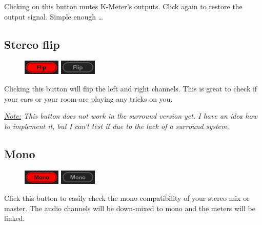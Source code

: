 Clicking on this button mutes K-Meter's outputs.  Click again to
restore the output signal.  Simple enough \dots

\subsection{Stereo flip}

\begin{figure}
\includegraphics[scale=\screenshotscale,clip]{include/images/button_flip_on.png}
\newline \vspace{-0.9\baselineskip}
\includegraphics[scale=\screenshotscale,clip]{include/images/button_flip_off.png}
\end{figure}

Clicking this button will flip the left and right channels.  This is
great to check if your ears or your room are playing any tricks on
you.

\emph{\underline{Note:} This button does not work in the surround
  version yet.  I have an idea how to implement it, but I can't test
  it due to the lack of a surround system.}

\newpage %

\subsection{Mono}

\begin{figure}
\includegraphics[scale=\screenshotscale,clip]{include/images/button_mono_on.png}
\newline \vspace{-0.9\baselineskip}
\includegraphics[scale=\screenshotscale,clip]{include/images/button_mono_off.png}
\end{figure}

Click this button to easily check the mono compatibility of your
stereo mix or master.  The audio channels will be down-mixed to mono
and the meters will be linked.

